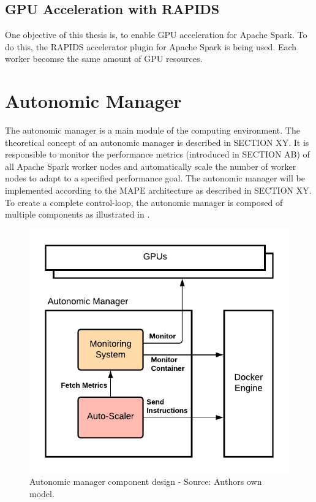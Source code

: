 

\subsection{GPU Acceleration with RAPIDS}
One objective of this thesis is, to enable GPU acceleration for Apache Spark.
%
To do this, the RAPIDS accelerator plugin for Apache Spark is being used.
Each worker becomse the same amount of GPU resources.


\section{Autonomic Manager}
\label{05_am}
The autonomic manager is a main module of the computing environment. The theoretical concept of an autonomic manager is described in SECTION XY.
It is responsible to monitor the performance metrics (introduced in SECTION AB) of all Apache Spark worker nodes and automatically scale the number of worker nodes to adapt to a specified performance goal.
The autonomic manager will be implemented according to the MAPE architecture as described in SECTION XY. To create a complete control-loop, the autonomic manager is composed of multiple components as illustrated in .
\label{subsec:05_am}
\begin{figure}[h]
\centering
\includegraphics[scale=1]{images/05_conceptual_design/autonomic_manager/autonomic_manager_concept}
\caption{Autonomic manager component design - Source: Authors own model.}
\label{fig:05_am_concept}
\end{figure}
